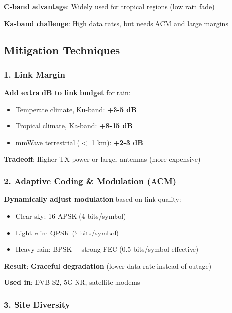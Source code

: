 \textbf{C-band advantage}: Widely used for tropical regions (low rain
fade)

\textbf{Ka-band challenge}: High data rates, but needs ACM and large
margins



\subsection{Mitigation Techniques}

\subsubsection{1. Link Margin}

\textbf{Add extra dB to link budget} for rain:

\begin{itemize}
\tightlist
\item
  Temperate climate, Ku-band: \textbf{+3-5 dB}
\item
  Tropical climate, Ka-band: \textbf{+8-15 dB}
\item
  mmWave terrestrial ($<$ 1 km): \textbf{+2-3 dB}
\end{itemize}

\textbf{Tradeoff}: Higher TX power or larger antennas (more expensive)



\subsubsection{2. Adaptive Coding \& Modulation (ACM)}

\textbf{Dynamically adjust modulation} based on link quality:

\begin{itemize}
\tightlist
\item
  Clear sky: 16-APSK (4 bits/symbol)
\item
  Light rain: QPSK (2 bits/symbol)
\item
  Heavy rain: BPSK + strong FEC (0.5 bits/symbol effective)
\end{itemize}

\textbf{Result}: \textbf{Graceful degradation} (lower data rate instead
of outage)

\textbf{Used in}: DVB-S2, 5G NR, satellite modems



\subsubsection{3. Site Diversity}

